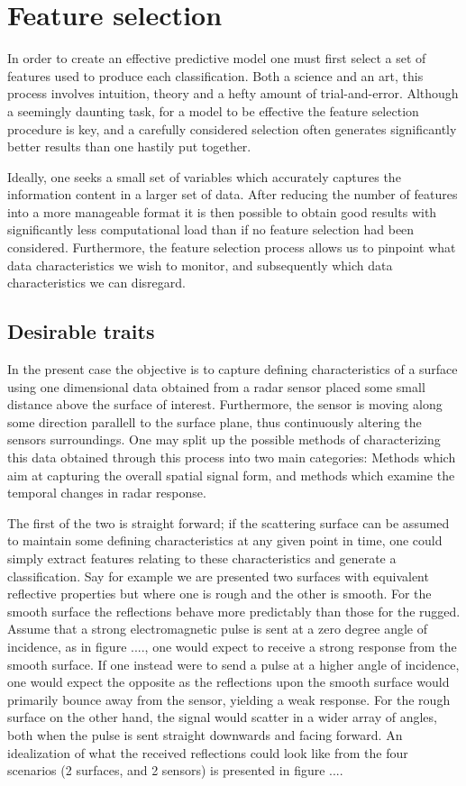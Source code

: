 \chapter{Feature selection}

In order to create an effective predictive model one must first select a set of features used to produce each classification. Both a science and an art, this process involves intuition, theory and a hefty amount of trial-and-error. Although a seemingly daunting task, for a model to be effective the feature selection procedure is key, and a carefully considered selection often generates significantly better results than one hastily put together. 

Ideally, one seeks a small set of variables which accurately captures the information content in a larger set of data. After reducing the number of features into a more manageable format it is then possible to obtain good results with significantly less computational load than if no feature selection had been considered. Furthermore, the feature selection process allows us to pinpoint what data characteristics we wish to monitor, and subsequently which data characteristics we can disregard. 

\section{Desirable traits}
\label{destrait}

In the present case the objective is to capture defining characteristics of a surface using one dimensional data obtained from a radar sensor placed some small distance above the surface of interest. Furthermore, the sensor is moving along some direction parallell to the surface plane, thus continuously altering the sensors surroundings. One may split up the possible methods of characterizing this data obtained through this process into two main categories: Methods which aim at capturing the overall spatial signal form, and methods which examine the temporal changes in radar response. 

The first of the two is straight forward; if the scattering surface can be assumed to maintain some defining characteristics at any given point in time, one could simply extract features relating to these characteristics and generate a classification. Say for example we are presented two surfaces with equivalent reflective properties but where one is rough and the other is smooth. For the smooth surface the reflections behave more predictably than those for the rugged. Assume that a strong electromagnetic pulse is sent at a zero degree angle of incidence, as in figure ...., one would expect to receive a strong response from the smooth surface. If one instead were to send a pulse at a higher angle of incidence, one would expect the opposite as the reflections upon the smooth surface would primarily bounce away from the sensor, yielding a weak response. For the rough surface on the other hand, the signal would scatter in a wider array of angles, both when the pulse is sent straight downwards and facing forward. An idealization of what the received reflections could look like from the four scenarios (2 surfaces, and 2 sensors) is presented in figure ....

